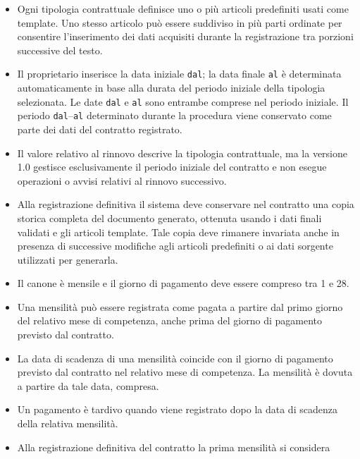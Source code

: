 \documentclass[12pt,a4paper]{article}
\begin{document}
\begin{itemize}
          Per ciascuna tipologia contrattuale sono definiti, in anni, la durata del periodo iniziale
          e la durata del rinnovo: rispettivamente 3 e 2 anni per il canone concordato, 4 e 4 anni
          per il canone libero.
    \item Ogni tipologia contrattuale definisce uno o più articoli predefiniti usati come template.
          Uno stesso articolo può essere suddiviso in più parti ordinate per consentire l'inserimento
          dei dati acquisiti durante la registrazione tra porzioni successive del testo.
    \item Il proprietario inserisce la data iniziale \texttt{dal}; la data finale \texttt{al}
          è determinata automaticamente in base alla durata del periodo iniziale della tipologia
          selezionata. Le date \texttt{dal} e \texttt{al} sono entrambe comprese nel periodo iniziale.
          Il periodo \texttt{dal}--\texttt{al} determinato durante la procedura viene conservato
          come parte dei dati del contratto registrato.
    \item Il valore relativo al rinnovo descrive la tipologia contrattuale, ma la versione 1.0 gestisce
          esclusivamente il periodo iniziale del contratto e non esegue operazioni o avvisi relativi
          al rinnovo successivo.
    \item Alla registrazione definitiva il sistema deve conservare nel contratto una copia storica
          completa del documento generato, ottenuta usando i dati finali validati e gli articoli template.
          Tale copia deve rimanere invariata anche in presenza di successive modifiche agli articoli
          predefiniti o ai dati sorgente utilizzati per generarla.
    \item Il canone è mensile e il giorno di pagamento deve essere compreso tra 1 e 28.
    \item Una mensilità può essere registrata come pagata a partire dal primo giorno
            del relativo mese di competenza, anche prima del giorno di pagamento
            previsto dal contratto.
      \item La data di scadenza di una mensilità coincide con il giorno di pagamento
            previsto dal contratto nel relativo mese di competenza. La mensilità è
            dovuta a partire da tale data, compresa.
      \item Un pagamento è tardivo quando viene registrato dopo la data di scadenza
            della relativa mensilità.
    \item Alla registrazione definitiva del contratto la prima mensilità si considera

\end{itemize}
\end{document}
